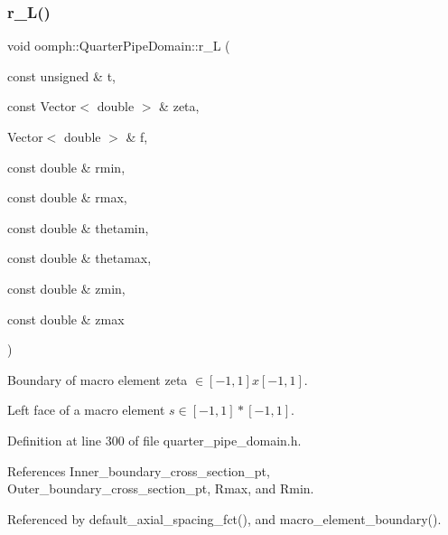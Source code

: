 \subsubsection{\texorpdfstring{r\+\_\+\+L()}{r\_L()}}
{\footnotesize\ttfamily void oomph\+::\+Quarter\+Pipe\+Domain\+::r\+\_\+L (\begin{DoxyParamCaption}\item[{const unsigned \&}]{t,  }\item[{const Vector$<$ double $>$ \&}]{zeta,  }\item[{Vector$<$ double $>$ \&}]{f,  }\item[{const double \&}]{rmin,  }\item[{const double \&}]{rmax,  }\item[{const double \&}]{thetamin,  }\item[{const double \&}]{thetamax,  }\item[{const double \&}]{zmin,  }\item[{const double \&}]{zmax }\end{DoxyParamCaption})\hspace{0.3cm}{\ttfamily [private]}}



Boundary of macro element zeta $ \in [-1,1]x[-1,1] $. 

Left face of a macro element $ s \in [-1,1]*[-1,1] $. 

Definition at line 300 of file quarter\+\_\+pipe\+\_\+domain.\+h.



References Inner\+\_\+boundary\+\_\+cross\+\_\+section\+\_\+pt, Outer\+\_\+boundary\+\_\+cross\+\_\+section\+\_\+pt, Rmax, and Rmin.



Referenced by default\+\_\+axial\+\_\+spacing\+\_\+fct(), and macro\+\_\+element\+\_\+boundary().

\mbox{\label{classoomph_1_1QuarterPipeDomain_aab6f3fd79bc6dea1eb267f3b55630a2b}} 
